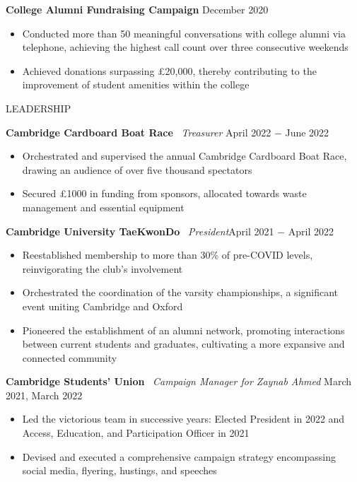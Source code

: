 \documentclass{article}
\begin{document}
\textbf{College Alumni Fundraising Campaign} \hfill December 2020
\begin{itemize}
    \item Conducted more than 50 meaningful conversations with college alumni via telephone, achieving the highest call count over three consecutive weekends
    \item Achieved donations surpassing £20,000, thereby contributing to the improvement of student amenities within the college
\end{itemize} \medskip

\uppercase{Leadership}

\textbf{Cambridge Cardboard Boat Race} \
\textit{Treasurer} \hfill April 2022 $-$ June 2022
\begin{itemize}
    \item Orchestrated and supervised the annual Cambridge Cardboard Boat Race, drawing an audience of over five thousand spectators
    \item Secured £1000 in funding from sponsors, allocated towards waste management and essential equipment
\end{itemize} \medskip

\textbf{Cambridge University TaeKwonDo} \
\textit{President}\hfill April 2021 $-$ April 2022
\begin{itemize}
    \item Reestablished membership to more than 30\% of pre-COVID levels, reinvigorating the club's involvement
    \item Orchestrated the coordination of the varsity championships, a significant event uniting Cambridge and Oxford
    \item Pioneered the establishment of an alumni network, promoting interactions between current students and graduates, cultivating a more expansive and connected community
\end{itemize} \medskip

\textbf{Cambridge Students' Union} \
\textit{Campaign Manager for Zaynab Ahmed} \hfill March 2021, March 2022
\begin{itemize}
    \item Led the victorious team in successive years: Elected President in 2022 and Access, Education, and Participation Officer in 2021
    \item Devised and executed a comprehensive campaign strategy encompassing social media, flyering, hustings, and speeches
\end{itemize} \medskip
\end{document}
